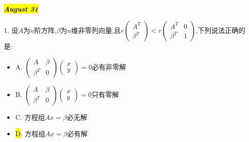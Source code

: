 \hl{\textbf{\textit{August 31}}}

1. 设$A$为$n$阶方阵,$\beta$为$n$维非零列向量,且$r\left( \begin{matrix}
	A^T\\\beta^T
\end{matrix}\right)<r\left( \begin{matrix}
A^T&0\\\beta^T&1
\end{matrix}\right)$,下列说法正确的是:  
\begin{itemize}
	\item A. $\left( \begin{matrix}
		A&\beta\\\beta^T&0
	\end{matrix}\right)\left( \begin{matrix}
	x\\y
\end{matrix}\right)=0$必有非零解
	\item B. $\left( \begin{matrix}
		A&\beta\\\beta^T&0
	\end{matrix}\right)\left( \begin{matrix}
		x\\y
	\end{matrix}\right)=0$只有零解
	\item C. 方程组$Ax=\beta$必无解
	\item \hl{D}. 方程组$Ax=\beta$必有解
\end{itemize}
